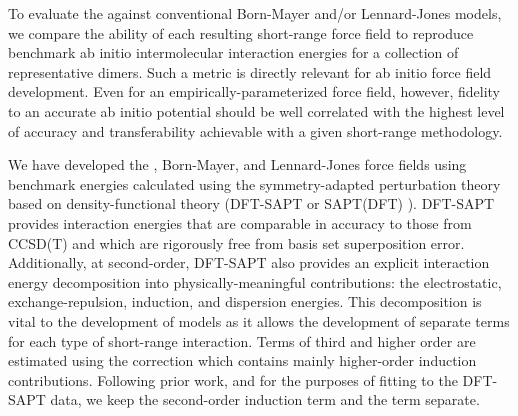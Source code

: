 To evaluate the \isaffold against conventional Born-Mayer and/or Lennard-Jones models, we compare the
ability of each resulting short-range force field to reproduce benchmark ab
initio intermolecular interaction energies for a collection of representative
dimers. Such a metric is directly relevant for ab initio force field
development. Even for an empirically-parameterized force field, however,
fidelity to an accurate ab initio potential should be well correlated with the
highest level of accuracy and transferability achievable with a given
short-range methodology. 

We have developed the \isaffold, Born-Mayer, and Lennard-Jones force fields using 
benchmark energies calculated using the symmetry-adapted perturbation theory
based on density-functional theory (DFT-SAPT or SAPT(DFT) 
\cite{Misquitta2002,Misquitta2003,Misquitta2005,Heßelmann2005a,Podeszwa2006a,Heßelmann2002,Heßelmann2003,Heßelmann2002a,Jansen2001}).
DFT-SAPT provides interaction energies that are comparable in accuracy to 
those from CCSD(T) and which are rigorously free from basis set superposition error.
\cite{Podeszwa2005a,Riley2010}
Additionally, at second-order, DFT-SAPT also provides an explicit interaction
energy decomposition into physically-meaningful contributions: 
the electrostatic, exchange-repulsion, induction, and dispersion energies.
This decomposition is vital to the development of models as it allows the
development of separate terms for each type of short-range interaction. 
Terms of third and higher order are estimated using the \dhf correction 
\cite{Jeziorska1987} which contains mainly higher-order induction contributions.
Following prior work,\cite{Yu2011,McDaniel2013} and for the purposes of
fitting to the DFT-SAPT data, we keep the second-order induction term and the
\dhf term separate.
%


